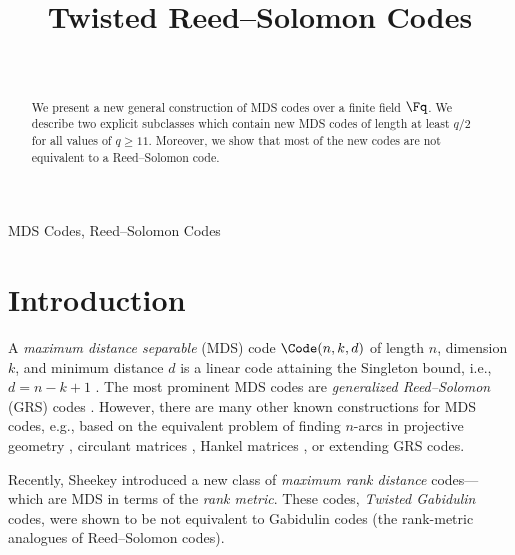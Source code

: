 \documentclass[conference,a4paper]{IEEEtran}
\begin{document}
\title{Twisted Reed--Solomon Codes}
\author{\\
}

\maketitle

\begin{abstract}
We present a new general construction of MDS codes over a finite field $\Fq$.
We describe two explicit subclasses which contain new MDS codes of length at least $q/2$ for all values of $q \ge 11$.
Moreover, we show that most of the new codes are not equivalent to a Reed--Solomon code.
\end{abstract}

\begin{IEEEkeywords}
MDS Codes, Reed--Solomon Codes
\end{IEEEkeywords}


\section{Introduction}

\noindent
A \emph{maximum distance separable} (MDS) code $\Code(n,k,d)$ of length $n$, dimension $k$, and minimum distance $d$ is a linear code attaining the Singleton bound, i.e., $d=n-k+1$ \cite{singleton1964maximum}.
The most prominent MDS codes are \emph{generalized Reed--Solomon} (GRS) codes \cite{reed1960polynomial}.
However, there are many other known constructions for MDS codes, e.g., based on the equivalent problem of finding $n$-arcs in projective geometry \cite{macwilliams1977theory}, circulant matrices \cite{roth_construction_1989}, Hankel matrices \cite{roth1985generator}, or extending GRS codes.

Recently, Sheekey \cite{sheekey_new_2015} introduced a new class of \emph{maximum rank distance} codes---which are MDS in terms of the \emph{rank metric}.
These codes, \emph{Twisted Gabidulin} codes, were shown to be not equivalent to Gabidulin codes (the rank-metric analogues of Reed--Solomon codes).
\end{document}
